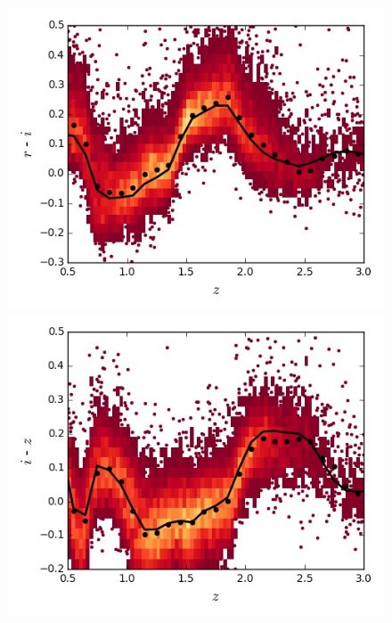 \begin{figure}
\begin{minipage}[b]{0.49\textwidth}
    \includegraphics[width=\textwidth]{figures/chapter06/sed_color_plots/ri.jpg}
  \end{minipage}
  \begin{minipage}[b]{0.49\textwidth}
    \includegraphics[width=\textwidth]{figures/chapter06/sed_color_plots/iz.jpg}
  \end{minipage} \\
\begin{minipage}[b]{0.49\textwidth}

\end{minipage}
\end{figure}
